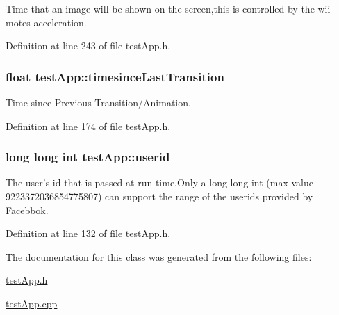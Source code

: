 Time that an image will be shown on the screen,this is controlled by the wii-\/motes acceleration. 



Definition at line 243 of file test\-App.\-h.

\hypertarget{classtest_app_acb60fb8a89e9ec5d461630a20b11ceda}{
\subsubsection[{timesince\-Last\-Transition}]{\setlength{\rightskip}{0pt plus 5cm}float test\-App\-::timesince\-Last\-Transition}}\label{classtest_app_acb60fb8a89e9ec5d461630a20b11ceda}


Time since Previous Transition/\-Animation. 



Definition at line 174 of file test\-App.\-h.

\hypertarget{classtest_app_a6ae76dc97fbeee00755f4a6cd6b87e19}{
\subsubsection[{userid}]{\setlength{\rightskip}{0pt plus 5cm}long long int test\-App\-::userid}}\label{classtest_app_a6ae76dc97fbeee00755f4a6cd6b87e19}


The user's id that is passed at run-\/time.\-Only a long long int (max value 9223372036854775807) can support the range of the userids provided by Facebbok. 



Definition at line 132 of file test\-App.\-h.



The documentation for this class was generated from the following files\-:\begin{DoxyCompactItemize}
\item 
\hyperlink{test_app_8h}{test\-App.\-h}\item 
\hyperlink{test_app_8cpp}{test\-App.\-cpp}\end{DoxyCompactItemize}
